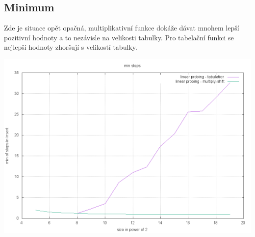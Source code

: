 \documentclass[12pt,a4paper]{report}
\begin{document}
\subsection*{Minimum}
Zde je situace opět opačná, multiplikativní funkce dokáže dávat mnohem lepší pozitivní 
hodnoty a to nezávisle na velikosti tabulky. Pro tabelační funkci se nejlepší hodnoty zhoršují 
s velikostí tabulky.

\includegraphics[width=\textwidth]{./tests/sequence_test/sequential-min-test.png}
\end{document}
